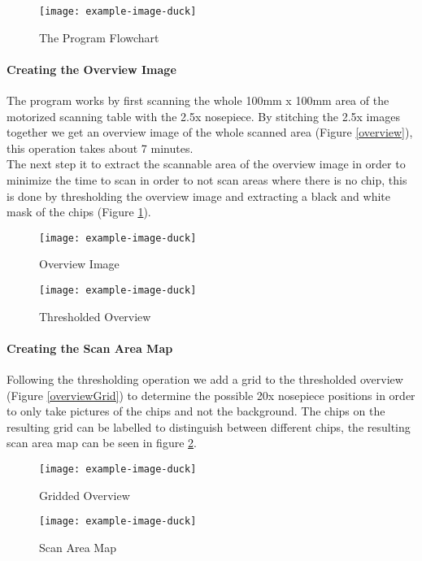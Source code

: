 \begin{figure}[h!]
    \centering
    \texttt{[image: example-image-duck]}
    \caption{The Program Flowchart}
\end{figure}
\newpage
\paragraph{Creating the Overview Image}
The program works by first scanning the whole 100mm x 100mm area of the motorized scanning table with the 2.5x nosepiece. By stitching the 2.5x images together we get an overview image of the whole scanned area (Figure \ref{overview}), this operation takes about 7 minutes.\\
The next step it to extract the scannable area of the overview image in order to minimize the time to scan in order to not scan areas where there is no chip, this is done by thresholding the overview image and extracting a black and white mask of the chips (Figure \ref{masked_overview}).

\begin{figure}[!h]
\centering
\begin{minipage}{.45\textwidth}
  \centering
  \texttt{[image: example-image-duck]}
  \caption{Overview Image}
  \label{overview}
\end{minipage}
\begin{minipage}{.45\textwidth}
  \centering
  \texttt{[image: example-image-duck]}
    \caption{Thresholded Overview}
    \label{masked_overview}
\end{minipage}
\end{figure}

\paragraph{Creating the Scan Area Map}
Following the thresholding operation we add a grid to the thresholded overview (Figure \ref{overviewGrid}) to determine the possible 20x nosepiece positions in order to only take pictures of the chips and not the background. The chips on the resulting grid can be labelled to distinguish between different chips, the resulting scan area map can be seen in figure \ref{scanAreaMap}.

\begin{figure}[!h]
\centering
\begin{minipage}{.45\textwidth}
  \centering
  \texttt{[image: example-image-duck]}
  \caption{Gridded Overview}
  \label{overviewGrid}
\end{minipage}
\begin{minipage}{.45\textwidth}
  \centering
  \texttt{[image: example-image-duck]}
    \caption{Scan Area Map}
    \label{scanAreaMap}
\end{minipage}
\end{figure}

